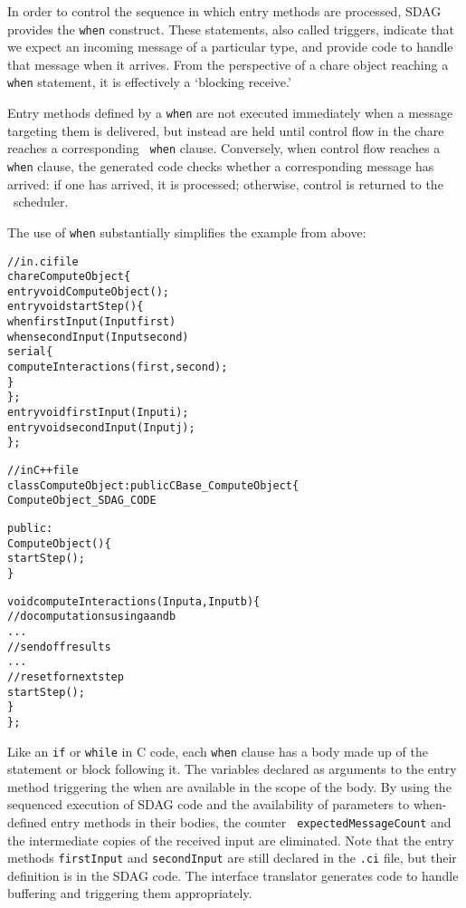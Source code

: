 In order to control the sequence in which entry methods are processed, SDAG
provides the {\tt when} construct. These statements, also called triggers,
indicate that we expect an incoming message of a particular type, and provide
code to handle that message when it arrives. From the perspective of a chare
object reaching a {\tt when} statement, it is effectively a `blocking
receive.'

Entry methods defined by a {\tt when} are
not executed immediately when a message targeting them is delivered, but
instead are held until control flow in the chare reaches a corresponding {\tt
  when} clause. Conversely, when control flow reaches a {\tt when} clause, the
generated code checks whether a corresponding message has arrived: if one has
arrived, it is processed; otherwise, control is returned to the
\charmpp\ scheduler. 

The use of {\tt when} substantially simplifies the example from above:
\begin{center}
\begin{alltt}
// in .ci file
chare ComputeObject \{
  entry void ComputeObject();
  entry void startStep() \{
    when firstInput(Input first)
      when secondInput(Input second)
        serial \{
          computeInteractions(first, second);
        \}
  \};
  entry void firstInput(Input i);
  entry void secondInput(Input j);
\};

// in C++ file
class ComputeObject : public CBase_ComputeObject \{
  ComputeObject_SDAG_CODE

public:
  ComputeObject() \{
    startStep();
  \}

  void computeInteractions(Input a, Input b) \{
    // do computations using a and b
    . . .
    // send off results
    . . .
    // reset for next step
    startStep();
  \}
\};
\end{alltt}
\end{center}
Like an {\tt if} or {\tt while} in C code, each {\tt when} clause has a body
made up of the statement or block following it. The variables declared as
arguments to the entry method triggering the when are available in the scope of
the body. By using the sequenced execution of SDAG code and the availability of
parameters to when-defined entry methods in their bodies, the counter {\tt
  expectedMessageCount} and the intermediate copies of the received input are
eliminated. Note that the entry methods {\tt firstInput} and {\tt secondInput}
are still declared in the {\tt .ci} file, but their definition is in the SDAG
code. The interface translator generates code to handle buffering and
triggering them appropriately.

